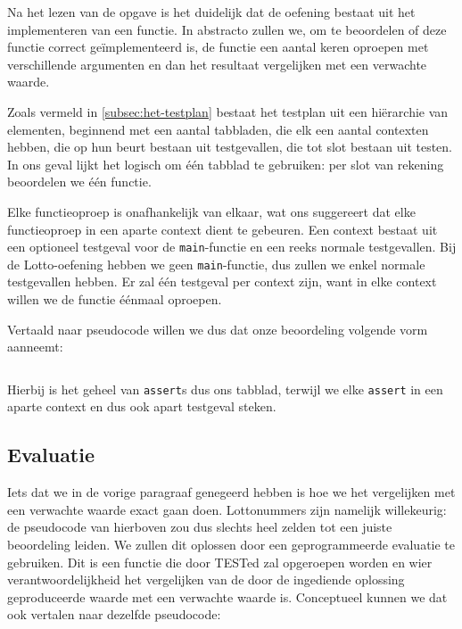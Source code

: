 Na het lezen van de opgave is het duidelijk dat de oefening bestaat uit het implementeren van een functie.
In abstracto zullen we, om te beoordelen of deze functie correct geïmplementeerd is, de functie een aantal keren oproepen met verschillende argumenten en dan het resultaat vergelijken met een verwachte waarde.

Zoals vermeld in \cref{subsec:het-testplan} bestaat het testplan uit een hiërarchie van elementen, beginnend met een aantal tabbladen, die elk een aantal contexten hebben, die op hun beurt bestaan uit testgevallen, die tot slot bestaan uit testen.
In ons geval lijkt het logisch om één tabblad te gebruiken: per slot van rekening beoordelen we één functie.

Elke functieoproep is onafhankelijk van elkaar, wat ons suggereert dat elke functieoproep in een aparte context dient te gebeuren.
Een context bestaat uit een optioneel testgeval voor de \texttt{main}-functie en een reeks normale testgevallen.
Bij de Lotto-oefening hebben we geen \texttt{main}-functie, dus zullen we enkel normale testgevallen hebben.
Er zal één testgeval per context zijn, want in elke context willen we de functie éénmaal oproepen.

Vertaald naar pseudocode willen we dus dat onze beoordeling volgende vorm aanneemt:

\inputminted{python}{code/lotto-eval.py}

Hierbij is het geheel van \texttt{assert}s dus ons tabblad, terwijl we elke \texttt{assert} in een aparte context en dus ook apart testgeval steken.

\subsection{Evaluatie}\label{subsec:oefening-lotto-evaluatie}

Iets dat we in de vorige paragraaf genegeerd hebben is hoe we het vergelijken met een verwachte waarde exact gaan doen.
Lottonummers zijn namelijk willekeurig: de pseudocode van hierboven zou dus slechts heel zelden tot een juiste beoordeling leiden.
We zullen dit oplossen door een geprogrammeerde evaluatie te gebruiken.
Dit is een functie die door TESTed zal opgeroepen worden en wier verantwoordelijkheid het vergelijken van de door de ingediende oplossing geproduceerde waarde met een verwachte waarde is.
Conceptueel kunnen we dat ook vertalen naar dezelfde pseudocode:

\inputminted{python}{code/lotto-eval-programmed.py}

